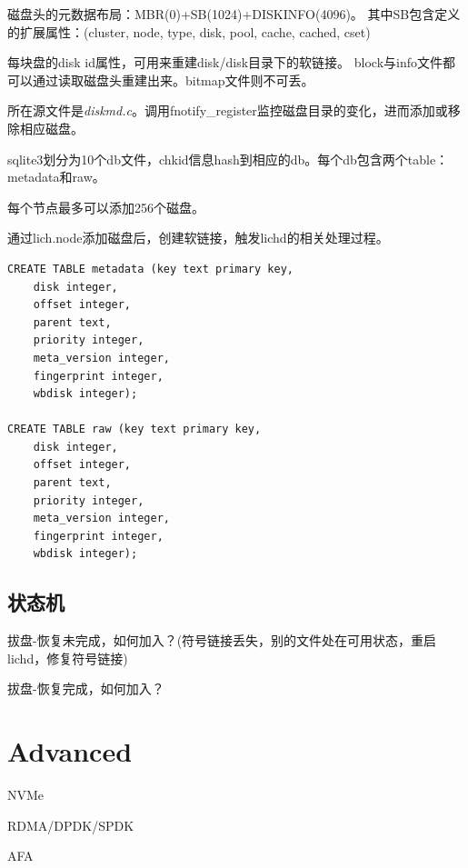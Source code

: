 磁盘头的元数据布局：MBR(0)+SB(1024)+DISKINFO(4096)。
其中SB包含定义的扩展属性：(cluster, node, type, disk, pool, cache, cached, cset)

每块盘的disk id属性，可用来重建disk/disk目录下的软链接。
block与info文件都可以通过读取磁盘头重建出来。bitmap文件则不可丢。

所在源文件是\emph{diskmd.c}。调用fnotify\_register监控磁盘目录的变化，进而添加或移除相应磁盘。

sqlite3划分为10个db文件，chkid信息hash到相应的db。每个db包含两个table：metadata和raw。

每个节点最多可以添加256个磁盘。

通过lich.node添加磁盘后，创建软链接，触发lichd的相关处理过程。

\begin{lstlisting}[frame=single]
CREATE TABLE metadata (key text primary key, 
    disk integer, 
    offset integer, 
    parent text, 
    priority integer, 
    meta_version integer, 
    fingerprint integer, 
    wbdisk integer);

CREATE TABLE raw (key text primary key, 
    disk integer, 
    offset integer, 
    parent text, 
    priority integer, 
    meta_version integer, 
    fingerprint integer, 
    wbdisk integer);
\end{lstlisting}

\subsection{状态机}

拔盘-恢复未完成，如何加入？(符号链接丢失，别的文件处在可用状态，重启lichd，修复符号链接)

拔盘-恢复完成，如何加入？

\section{Advanced}

NVMe

RDMA/DPDK/SPDK

AFA
